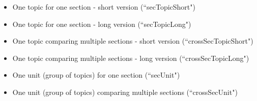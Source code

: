 \documentclass[11pt,a4paper,oldfontcommands,openany]{memoir}
\numberwithin{equation}{section} %
\begin{document}
\begin{framed}
\begin{itemize}
\vspace{-3mm}
\item One topic for one section - short version (``secTopicShort")
\item One topic for one section - long version (``secTopicLong")
\item One topic comparing multiple sections - short version (``crossSecTopicShort")
\item One topic comparing multiple sections - long version (``crossSecTopicLong")
\item One unit (group of topics) for one section (``secUnit")
\item One unit (group of topics) comparing multiple sections (``crossSecUnit")
\end{itemize}
\end{framed}


\end{document}
